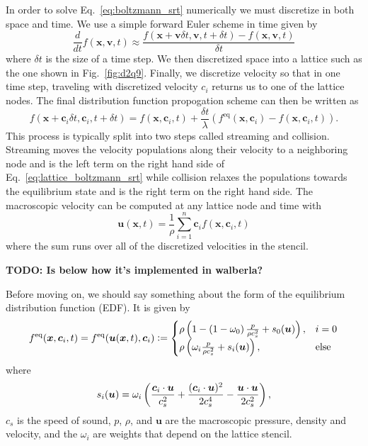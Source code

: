 In order to solve Eq.~\eqref{eq:boltzmann_srt} numerically we must discretize in both space and time. We use a simple forward Euler scheme in time given by
\begin{equation}\label{eq:time_euler}
\frac{d}{dt} f(\bm{x}, \bm{v},t) \approx \frac{ f(\bm{x} +\bm{v}\delta t, \bm{v}, t + \delta t) - f(\bm{x}, \bm{v}, t)}{\delta t}
\end{equation}
where $\delta t$ is the size of a time step. We then discretized space into a lattice such as the one shown in Fig.~\ref{fig:d2q9}. Finally, we discretize velocity so that in one time step, traveling with discretized velocity $c_i$ returns us to one of the lattice nodes. The final distribution function propogation scheme can then be written as
\begin{equation}\label{eq:lattice_boltzmann_srt}
f(\bm{x} +\bm{c}_i\delta t, \bm{c}_i, t + \delta t) = f(\bm{x},\bm{c}_i,t) + \frac{\delta t}{\lambda} \left(f^{\mathrm{eq}}(\bm{x},\bm{c}_i) - f(\bm{x},\bm{c}_i, t)\right).
\end{equation}
This process is typically split into two steps called streaming and collision. Streaming moves the velocity populations along their velocity to a neighboring node and is the left term on the right hand side of Eq.~\eqref{eq:lattice_boltzmann_srt} while collision relaxes the populations towards the equilibrium state and is the right term on the right hand side. The macroscopic velocity can be computed at any lattice node and time with
\begin{equation}
\bm{u}(\bm{x},t) = \frac{1}{\rho} \sum_{i = 1}^{n} \bm{c}_i f(\bm{x},\bm{c}_i, t)
\end{equation}
where the sum runs over all of the discretized velocities in the stencil.

\textbf{TODO: Is below how it's implemented in walberla?}

Before moving on, we should say something about the form of the equilibrium distribution function (EDF). It is given by
\begin{equation}\label{eq:equilibrium_distribution_function}
f^{\mathrm{eq}}(\bm{x},\bm{c}_i,t) = f^{\mathrm{eq}}(\bm{u}(\bm{x},t),\bm{c}_i) \vcentcolon=\begin{cases}
\rho\left(1-\left(1-\omega_0\right)\frac{p}{\rho c_s^2}+s_0(\bm{u})\right), & i = 0 \\
\rho\left(\omega_i\frac{p}{\rho c_s^2} + s_i(\bm{u})\right), &\text{else}
\end{cases}
\end{equation}
where
\begin{equation}
s_i(\bm{u}) = \omega_i\left(\frac{\bm{c}_i\cdot \bm{u}}{c_s^2} + \frac{(\bm{c}_i \cdot \bm{u})^2}{2c_s^4} - \frac{\bm{u} \cdot \bm{u}}{2c_s^2}\right),
\end{equation}
$c_s$ is the speed of sound, $p$, $\rho$, and $\bm{u}$ are the macroscopic pressure, density and velocity, and the $\omega_i$ are weights that depend on the lattice stencil.

